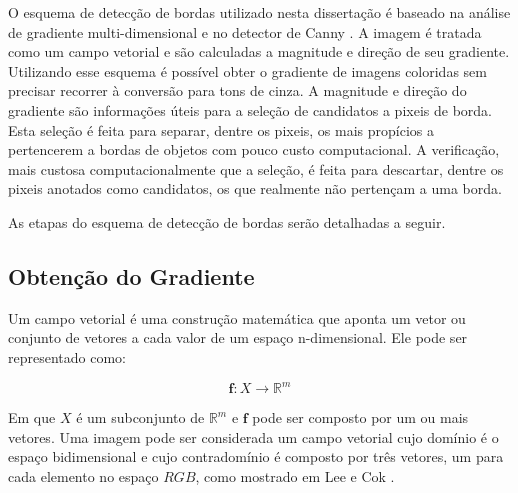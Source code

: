 
O esquema de detecção de bordas utilizado nesta dissertação é baseado na análise de gradiente multi-dimensional \cite{borda00} e no detector de Canny \cite{canny}. A imagem é tratada como um campo vetorial e são calculadas a magnitude e direção de seu 	gradiente. Utilizando esse esquema é possível obter o gradiente de imagens coloridas sem precisar recorrer à conversão para tons de cinza. A magnitude e direção do gradiente são informações úteis para a seleção de candidatos a pixeis de borda. Esta seleção é feita para separar, dentre os pixeis, os mais propícios a pertencerem a bordas de objetos com pouco custo computacional. A verificação, mais custosa computacionalmente que a seleção, é feita para descartar, dentre os pixeis anotados como candidatos, os que realmente não pertençam a uma borda.

As etapas do esquema de detecção de bordas serão detalhadas a seguir.





\subsection{Obtenção do Gradiente}


Um campo vetorial é uma construção matemática que aponta um vetor ou conjunto de vetores a cada valor de um espaço n-dimensional. Ele pode ser representado como:

$$ \textbf{f}:X \rightarrow \mathbb{R}^m $$

Em que $X$ é um subconjunto de $\mathbb{R}^m$ e $\textbf{f}$ pode ser composto por um ou mais vetores. Uma imagem pode ser considerada um campo vetorial cujo domínio é o espaço bidimensional e cujo contradomínio é composto por três vetores, um para cada elemento no espaço $RGB$, como mostrado em Lee e Cok \cite{borda00}.

